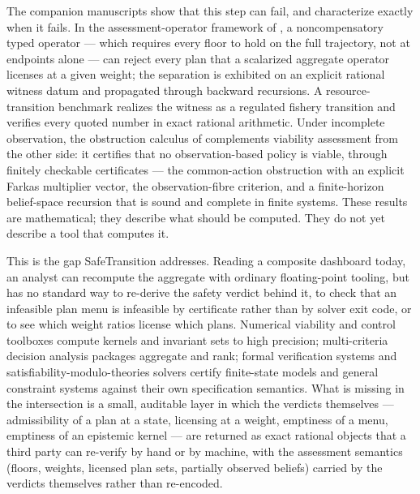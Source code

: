 \documentclass[3p,11pt]{elsarticle}
\begin{document}
The companion manuscripts show that this step can fail, and characterize
exactly when it fails. In the assessment-operator framework of \citet{Abaee2026a},
a noncompensatory typed operator --- which requires every floor to hold on
the full trajectory, not at endpoints alone --- can reject every plan that a
scalarized aggregate operator licenses at a given weight; the separation is
exhibited on an explicit rational witness datum and propagated through
backward recursions. A resource-transition benchmark realizes the witness as
a regulated fishery transition and verifies every quoted number in exact
rational arithmetic. Under incomplete observation, the obstruction calculus
of \citet{Abaee2026b} complements viability assessment from the other side: it
certifies that no observation-based policy is viable, through finitely
checkable certificates --- the common-action obstruction with an explicit
Farkas multiplier vector, the observation-fibre criterion, and a
finite-horizon belief-space recursion that is sound and complete in finite
systems. These results are mathematical; they describe what should be
computed. They do not yet describe a tool that computes it.

This is the gap SafeTransition addresses. Reading a composite dashboard
today, an analyst can recompute the aggregate with ordinary floating-point
tooling, but has no standard way to re-derive the safety verdict behind it,
to check that an infeasible plan menu is infeasible by certificate rather
than by solver exit code, or to see which weight ratios license which plans.
Numerical viability and control toolboxes compute kernels and invariant sets
to high precision; multi-criteria decision analysis packages aggregate and
rank; formal verification systems and satisfiability-modulo-theories solvers
certify finite-state models and general constraint systems against their own
specification semantics. What is missing in the intersection is a small,
auditable layer in which the verdicts themselves --- admissibility of a plan
at a state, licensing at a weight, emptiness of a menu, emptiness of an
epistemic kernel --- are returned as exact rational objects that a third
party can re-verify by hand or by machine, with the assessment semantics
(floors, weights, licensed plan sets, partially observed beliefs) carried by
the verdicts themselves rather than re-encoded.
\end{document}

